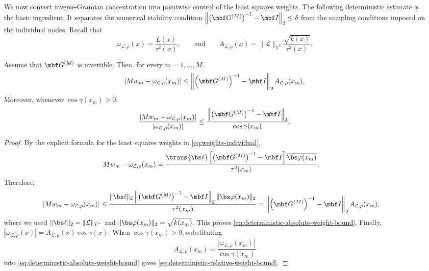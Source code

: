 \documentclass[10pt,dvipsnames]{amsart}
\begin{document}
We now convert inverse-Gramian concentration into pointwise control of the
least squares weights.  The following deterministic estimate is the basic
ingredient.  It separates the numerical stability condition
\(
    \left\|
    \left(\mbf G^{(M)}\right)^{-1}-\mbf I
    \right\|_2 \leq \delta
\)
from the sampling conditions imposed on the individual nodes. Recall that
\[
    \omega_{\mathcal L,\rho}(x)
    =
    \frac{\overline{L(x)}}{\tau^2(x)},
    \qquad\text{and}\qquad
    A_{\mathcal L,\rho}(x)
    =
    \|\mathcal L\|_{V^*}
    \frac{\sqrt{k(x)}}{\tau^2(x)}.
\]

\begin{lemma}
\label{lemma:deterministic-weight-perturbation}

Assume that \(\mbf G^{(M)}\) is invertible. Then, for every
\(m=1,\ldots,M\),
\begin{equation}
\label{eq:deterministic-absolute-weight-bound}
    \left|
        M w_m-\omega_{\mathcal L,\rho}(x_m)
    \right|
    \leq
    \left\|
        \left(\mbf G^{(M)}\right)^{-1}-\mbf I
    \right\|_2
    A_{\mathcal L,\rho}(x_m).
\end{equation}
Moreover, whenever \(\cos\gamma(x_m)>0\),
\begin{equation}
\label{eq:deterministic-relative-weight-bound}
    \frac{\left|
        M w_m-\omega_{\mathcal L,\rho}(x_m)
    \right|}{\left|
        \omega_{\mathcal L,\rho}(x_m)
    \right|}
    \leq
    \frac{
        \left\|
            \left(\mbf G^{(M)}\right)^{-1}-\mbf I
        \right\|_2
    }{\cos\gamma(x_m)}
    .
\end{equation}
\end{lemma}

\begin{proof}
By the explicit formula for the least squares weights in \eqref{eq:weights-individual},
\begin{align*}
    M w_m-\omega_{\mathcal L,\rho}(x_m)
    &=
    \frac{
        \trans{\bs\ell}
        \left[
            \left(\mbf G^{(M)}\right)^{-1}-\mbf I
        \right]
        \overline{\bs\varphi(x_m)}
    }{\tau^2(x_m)}.
\end{align*}
Therefore,
\begin{align*}
    \left|
        M w_m-\omega_{\mathcal L,\rho}(x_m)
    \right|
    &\leq
    \frac{
        \|\bs\ell\|_2
        \left\|
            \left(\mbf G^{(M)}\right)^{-1}-\mbf I
        \right\|_2
        \|\bs\varphi(x_m)\|_2
    }{\tau^2(x_m)} 
    =
    \left\|
        \left(\mbf G^{(M)}\right)^{-1}-\mbf I
    \right\|_2
    A_{\mathcal L,\rho}(x_m),
\end{align*}
where we used \(\|\bs\ell\|_2=\|\mathcal L\|_{V^*}\) and \(\|\bs\varphi(x_m)\|_2=\sqrt{k(x_m)}.\)
This proves \eqref{eq:deterministic-absolute-weight-bound}. Finally,
\(
    \left|\omega_{\mathcal L,\rho}(x)\right|
    =
    A_{\mathcal L,\rho}(x)\cos\gamma(x).
\)
When \(\cos\gamma(x_m)>0\), substituting
\[
    A_{\mathcal L,\rho}(x_m)
    =
    \frac{
        |\omega_{\mathcal L,\rho}(x_m)|
    }{\cos\gamma(x_m)}
\]
into \eqref{eq:deterministic-absolute-weight-bound} gives
\eqref{eq:deterministic-relative-weight-bound}.
\end{proof}
\end{document}
